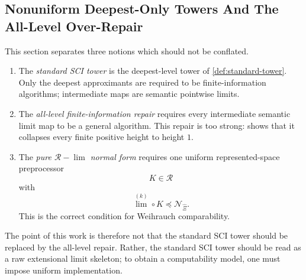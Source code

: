 \documentclass{lmcs} %
\theoremstyle{plain}
\theoremstyle{plain}
\theoremstyle{definition}
\theoremstyle{remark}
\theoremstyle{definition}
\theoremstyle{remark}
\numberwithin{equation}{section}
\newcommand{\Lim}{\operatorname{lim}}
\newcommand{\Limi}[1]{\Lim^{(#1)}}
\begin{document}
\subsection{Nonuniform Deepest-Only Towers And The All-Level Over-Repair}\label{sec:nonuniformity-all-level}
This section separates three notions which should not be conflated.

\begin{enumerate}
\item The \textit{standard SCI tower} is the deepest-level tower of \cref{def:standard-tower}. Only the deepest approximants are required to be finite-information algorithms; intermediate maps are semantic pointwise limits.

\item The \textit{all-level finite-information repair} requires every intermediate semantic limit map to be a general algorithm. This repair is too strong:  shows that it collapses every finite positive height to height \(1\).

\item The \textit{pure $\mathcal R -\Lim$ normal form} requires one uniform represented-space preprocessor
\[
        K\in \mathcal R
\]
with
\[
        \Limi{k} \circ K\preceq \mathcal N_{\widehat{\Xi}}.
\]
This is the correct condition for Weihrauch comparability.
\end{enumerate}

The point of this work is therefore not that the standard SCI tower should be replaced by the all-level repair. Rather, the standard SCI tower should be read as a raw extensional
limit skeleton; to obtain a computability model, one must impose uniform implementation.
\end{document}
